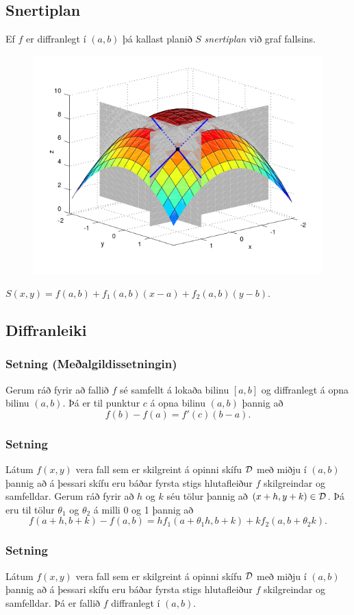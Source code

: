 \subsection{Snertiplan}
  Ef $f$ er diffranlegt í $(a,b)$ þá kallast planið $S$ \emph{snertiplan} við graf fallsins.
  \begin{figure}
           \centering
            \includegraphics[width=0.6\linewidth]{bothpart.png}
	\caption*{}
    \end{figure}
    $S(x,y) = f(a,b) + f_1(a,b)(x-a)+f_2(a,b)(y-b)$.



\subsection{Diffranleiki} 

\subsubsection{Setning  (Meðalgildissetningin)}
Gerum ráð fyrir að fallið $f$
sé samfellt á lokaða bilinu $[a,b]$ og diffranlegt á opna bilinu
$(a,b)$.  Þá er til punktur $c$ á opna bilinu $(a,b)$ þannig að 
$$f(b)-f(a)=f'(c)(b-a).$$




\subsubsection{Setning }

Látum  $f(x,y)$ vera fall
sem er skilgreint á opinni 
skífu $\cal D$ með miðju í $(a,b)$ þannig að á þessari skífu eru báðar
fyrsta stigs hlutafleiður $f$ skilgreindar og samfelldar.  Gerum ráð fyrir að $h$
og $k$ séu tölur þannig að $(x+h, y+k)\in{\cal D}$.  Þá eru til tölur
$\theta_1$ og $\theta_2$ á milli 0 og 1 þannig að 
$$f(a+h,b+k)-f(a,b)=hf_1(a+\theta_1h,b+k)+kf_2(a,b+\theta_2k).$$


\subsubsection{Setning }
  Látum  $f(x,y)$ vera fall
sem er skilgreint á opinni 
skífu $\cal D$ með miðju í $(a,b)$ þannig að á þessari skífu eru báðar
fyrsta stigs hlutafleiður $f$ skilgreindar og samfelldar. 
Þá er fallið $f$ diffranlegt í $(a,b)$.




